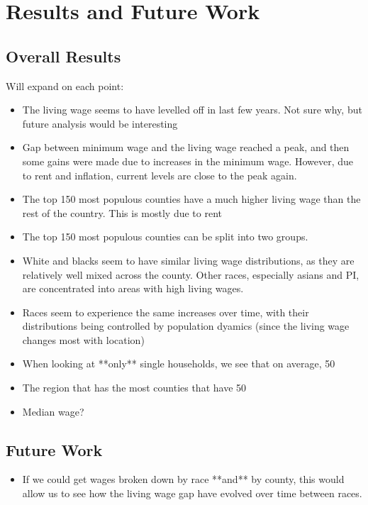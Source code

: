 \chapter{Results and Future Work}\label{ch:results}

\section{Overall Results}

Will expand on each point:

\begin{itemize}
\item The living wage seems to have levelled off in last few years. Not sure why, but future analysis would be interesting
\item Gap between minimum wage and the living wage reached a peak, and then some gains were made due to increases in the minimum wage. However, due to rent and inflation, current levels are close to the peak again.
\item The top 150 most populous counties have a much higher living wage than the rest of the country. This is mostly due to rent
\item The top 150 most populous counties can be split into two groups. 
\item White and blacks seem to have similar living wage distributions, as they are relatively well mixed across the county. Other races, especially asians and PI, are concentrated into areas with high living wages.
\item Races seem to experience the same increases over time, with their distributions being controlled by population dyamics (since the living wage changes most with location)
\item When looking at **only** single households, we see that on average, 50%
\item The region that has the most counties that have 50%

\item Median wage?
\end{itemize}



\section{Future Work}

\begin{itemize}
\item If we could get wages broken down by race **and** by county, this would allow us to see how the living wage gap have evolved over time between races. 
\end{itemize}
